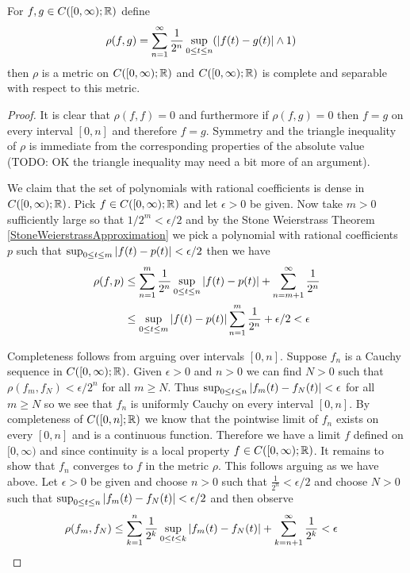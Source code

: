 \begin{lem}For $f,g \in C([0,\infty) ; \mathbb{R})$ define
\begin{align*}
\rho(f,g) &= \sum_{n=1}^\infty \frac{1}{2^n} \sup_{0 \leq t \leq n}
(\left \vert f(t) - g(t) \right \vert \wedge 1)
\end{align*}
then $\rho$ is a metric on $C([0,\infty) ; \mathbb{R})$ and $C([0,\infty);
\mathbb{R})$ is complete and separable with respect to this metric.
\end{lem}
\begin{proof}
It is clear that $\rho(f,f) = 0$ and furthermore if $\rho(f,g) = 0$
then $f = g$ on every interval $[0,n]$ and therefore $f = g$.
Symmetry and the triangle inequality of $\rho$ is immediate from the
corresponding properties of the absolute value (TODO: OK the triangle
inequality may need a bit more of an argument).

We claim that the set of polynomials with rational coefficients is
dense in $C([0,\infty); \mathbb{R})$.  Pick $f \in C([0,\infty); \mathbb{R})$
and let $\epsilon > 0$ be given.  Now take $m > 0$ sufficiently large
so that $1/2^m < \epsilon / 2$ and by the Stone Weierstrass Theorem \ref{StoneWeierstrassApproximation} we
pick a polynomial with rational coefficients $p$ such that $\sup_{0
  \leq t \leq m} \left \vert f(t) - p(t) \right \vert < \epsilon/2$ then we have
\begin{align*}
\rho(f,p) &\leq \sum_{n=1}^m\frac{1}{2^n} \sup_{0 \leq t \leq n}
\left \vert f(t) - p(t) \right \vert + \sum_{n=m+1}^\infty \frac{1}{2^n} \\
&\leq \sup_{0 \leq t \leq m}
\left \vert f(t) - p(t) \right \vert \sum_{n=1}^m\frac{1}{2^n} + \epsilon/2 <\epsilon
\end{align*}

Completeness follows from arguing over intervals $[0,n]$.  Suppose
$f_n$ is a Cauchy sequence in $C([0,\infty); \mathbb{R})$.  Given
$\epsilon > 0$ and $n > 0$ we can find $N > 0$ such that $\rho(f_m,
f_N) < \epsilon/2^n$ for all $m \geq N$.  Thus $\sup_{0 \leq t \leq n}
\left \vert f_m(t) - f_N(t) \right \vert < \epsilon$ for all $m \geq N$ so we see that
$f_n$ is uniformly  Cauchy on every interval $[0,n]$.  By completeness
of $C([0,n];\mathbb{R})$ we know that the pointwise limit of $f_n$ exists
on every $[0,n]$ and is a continuous function.  Therefore we have a
limit $f$ defined on $[0,\infty)$ and since continuity is a local
property $f \in C([0,\infty); \mathbb{R})$.  It remains to show that $f_n$
converges to $f$ in the metric $\rho$.  This follows arguing as we
have above.  Let $\epsilon > 0$ be given and choose $n > 0$ such that
$\frac{1}{2^n} < \epsilon/2$ and choose $N > 0$ such that $\sup_{0 \leq t \leq n}
\left \vert f_m(t) - f_N(t) \right \vert < \epsilon/2$ and then observe
\begin{align*}
\rho(f_m, f_N) &\leq \sum_{k=1}^n \frac{1}{2^k} \sup_{0 \leq t \leq k}
\left \vert f_m(t) - f_N(t) \right \vert + \sum_{k=n+1}^\infty \frac{1}{2^k}  < \epsilon
\end{align*}
\end{proof}

